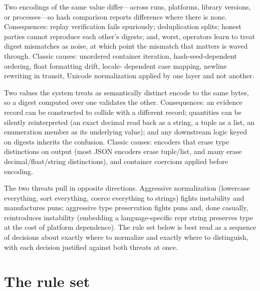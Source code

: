 \begin{threat}
\label{ch05:threat:instability}
Two encodings of the same value differ---across runs, platforms, library
versions, or processes---so hash comparison reports difference where there is
none. Consequences: replay verification fails spuriously; deduplication
splits; honest parties cannot reproduce each other's digests; and, worst,
operators learn to treat digest mismatches as noise, at which point the
mismatch that matters is waved through. Classic causes: unordered container
iteration, hash-seed-dependent ordering, float formatting drift, locale-
dependent case mapping, newline rewriting in transit, Unicode normalization
applied by one layer and not another.
\end{threat}

\begin{threat}
\label{ch05:threat:puns}
Two values the system treats as semantically distinct encode to the same
bytes, so a digest computed over one validates the other. Consequences: an
evidence record can be constructed to collide with a different record;
quantities can be silently reinterpreted (an exact decimal read back as a
string, a tuple as a list, an enumeration member as its underlying value);
and any downstream logic keyed on digests inherits the confusion. Classic
causes: encoders that erase type distinctions on output (most JSON encoders
erase tuple/list, and many erase decimal/float/string distinctions), and
container coercions applied before encoding.
\end{threat}

The two threats pull in opposite directions. Aggressive normalization
(lowercase everything, sort everything, coerce everything to strings) fights
instability and manufactures puns; aggressive type preservation fights puns
and, done casually, reintroduces instability (embedding a language-specific
repr string preserves type at the cost of platform dependence). The rule set
below is best read as a sequence of decisions about exactly where to
normalize and exactly where to distinguish, with each decision justified
against both threats at once.

\section{The rule set}\label{ch05:rules}

